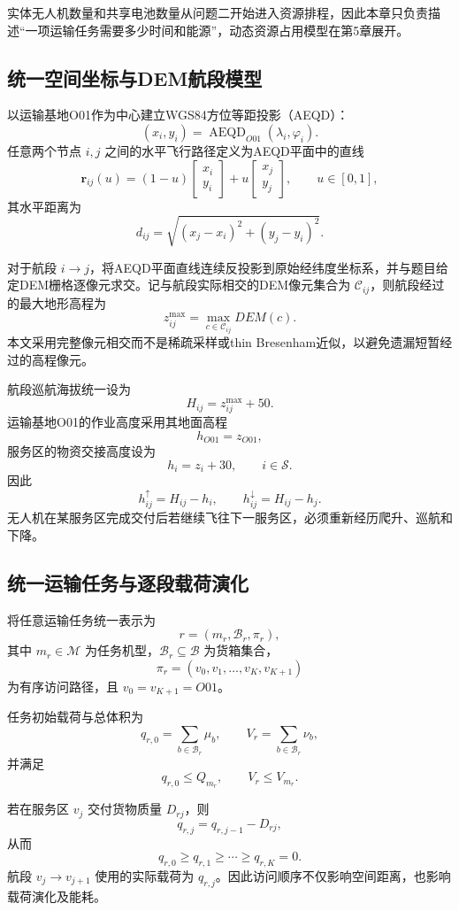 \documentclass[UTF8,a4paper,12pt]{ctexart}
\begin{document}
实体无人机数量和共享电池数量从问题二开始进入资源排程，因此本章只负责描述“一项运输任务需要多少时间和能源”，动态资源占用模型在第5章展开。

\subsection{统一空间坐标与DEM航段模型}

以运输基地O01作为中心建立WGS84方位等距投影（AEQD）：
\[
(x_i,y_i)=\operatorname{AEQD}_{O01}(\lambda_i,\varphi_i).
\]
任意两个节点 $i,j$ 之间的水平飞行路径定义为AEQD平面中的直线
\[
\mathbf r_{ij}(u)
=
(1-u)
\begin{bmatrix}
x_i\\y_i
\end{bmatrix}
+
u
\begin{bmatrix}
x_j\\y_j
\end{bmatrix},
\qquad u\in[0,1],
\]
其水平距离为
\[
d_{ij}
=
\sqrt{(x_j-x_i)^2+(y_j-y_i)^2}.
\]

对于航段 $i\rightarrow j$，将AEQD平面直线连续反投影到原始经纬度坐标系，并与题目给定DEM栅格逐像元求交。记与航段实际相交的DEM像元集合为 $\mathcal C_{ij}$，则航段经过的最大地形高程为
\[
z_{ij}^{\max}
=
\max_{c\in\mathcal C_{ij}}DEM(c).
\]
本文采用完整像元相交而不是稀疏采样或thin Bresenham近似，以避免遗漏短暂经过的高程像元。

航段巡航海拔统一设为
\[
H_{ij}=z_{ij}^{\max}+50.
\]
运输基地O01的作业高度采用其地面高程
\[
h_{O01}=z_{O01},
\]
服务区的物资交接高度设为
\[
h_i=z_i+30,\qquad i\in\mathcal S.
\]
因此
\[
h_{ij}^{\uparrow}=H_{ij}-h_i,\qquad
h_{ij}^{\downarrow}=H_{ij}-h_j.
\]
无人机在某服务区完成交付后若继续飞往下一服务区，必须重新经历爬升、巡航和下降。

\subsection{统一运输任务与逐段载荷演化}

将任意运输任务统一表示为
\[
r=(m_r,\mathcal B_r,\pi_r),
\]
其中 $m_r\in\mathcal M$ 为任务机型，$\mathcal B_r\subseteq\mathcal B$ 为货箱集合，
\[
\pi_r=(v_0,v_1,\ldots,v_K,v_{K+1})
\]
为有序访问路径，且 $v_0=v_{K+1}=O01$。

任务初始载荷与总体积为
\[
q_{r,0}=\sum_{b\in\mathcal B_r}\mu_b,\qquad
V_r=\sum_{b\in\mathcal B_r}\nu_b,
\]
并满足
\[
q_{r,0}\le Q_{m_r},\qquad
V_r\le V_{m_r}.
\]

若在服务区 $v_j$ 交付货物质量 $D_{rj}$，则
\[
q_{r,j}=q_{r,j-1}-D_{rj},
\]
从而
\[
q_{r,0}\ge q_{r,1}\ge\cdots\ge q_{r,K}=0.
\]
航段 $v_j\rightarrow v_{j+1}$ 使用的实际载荷为 $q_{r,j}$。因此访问顺序不仅影响空间距离，也影响载荷演化及能耗。
\end{document}
